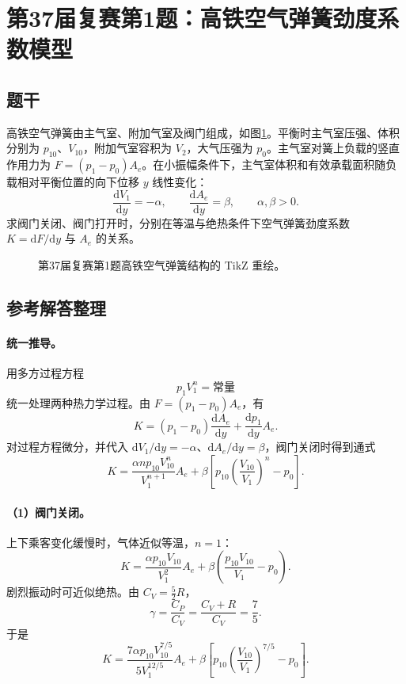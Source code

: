 \section{第37届复赛第1题：高铁空气弹簧劲度系数模型}
\subsection{题干}
高铁空气弹簧由主气室、附加气室及阀门组成，如图\ref{fig:cpho37q01}。平衡时主气室压强、体积分别为 $p_{10}$、$V_{10}$，附加气室容积为 $V_2$，大气压强为 $p_0$。主气室对簧上负载的竖直作用力为 $F=(p_1-p_0)A_e$。在小振幅条件下，主气室体积和有效承载面积随负载相对平衡位置的向下位移 $y$ 线性变化：
\[
\frac{\mathrm dV_1}{\mathrm dy}=-\alpha,\qquad
\frac{\mathrm dA_e}{\mathrm dy}=\beta,\qquad \alpha,\beta>0.
\]
求阀门关闭、阀门打开时，分别在等温与绝热条件下空气弹簧劲度系数 $K=\mathrm dF/\mathrm dy$ 与 $A_e$ 的关系。
\begin{figure}[htbp]\centering

\caption{第37届复赛第1题高铁空气弹簧结构的 TikZ 重绘。}\label{fig:cpho37q01}
\end{figure}

\subsection{参考解答整理}
\paragraph{统一推导。} 用多方过程方程
\[
p_1V_1^n=\text{常量}
\]
统一处理两种热力学过程。由 $F=(p_1-p_0)A_e$，有
\[
K=(p_1-p_0)\frac{\mathrm dA_e}{\mathrm dy}
+\frac{\mathrm dp_1}{\mathrm dy}A_e.
\]
对过程方程微分，并代入 $\mathrm dV_1/\mathrm dy=-\alpha$、$\mathrm dA_e/\mathrm dy=\beta$，阀门关闭时得到通式
\[
K=\frac{\alpha n p_{10}V_{10}^n}{V_1^{n+1}}A_e
+\beta\left[p_{10}\left(\frac{V_{10}}{V_1}\right)^n-p_0\right].
\]

\paragraph{（1）阀门关闭。} 上下乘客变化缓慢时，气体近似等温，$n=1$：
\[
\boxed{K=\frac{\alpha p_{10}V_{10}}{V_1^2}A_e
+\beta\left(\frac{p_{10}V_{10}}{V_1}-p_0\right).}
\]
剧烈振动时可近似绝热。由 $C_V=\frac52R$，
\[
\gamma=\frac{C_P}{C_V}=\frac{C_V+R}{C_V}=\frac75.
\]
于是
\[
\boxed{K=\frac{7\alpha p_{10}V_{10}^{7/5}}{5V_1^{12/5}}A_e
+\beta\left[p_{10}\left(\frac{V_{10}}{V_1}\right)^{7/5}-p_0\right].}
\]

